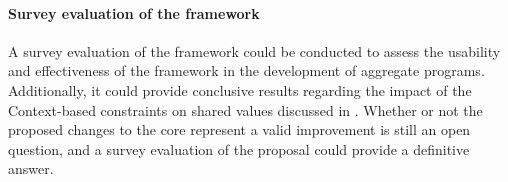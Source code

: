 \paragraph{Survey evaluation of the framework} A survey evaluation of the framework could be conducted to assess the usability and effectiveness of the framework in the development of aggregate programs.
%
Additionally, it could provide conclusive results regarding the impact of the Context-based constraints on shared values discussed in .
%
Whether or not the proposed changes to the core represent a valid improvement is still an open question, and a survey evaluation of the proposal could provide a definitive answer.
